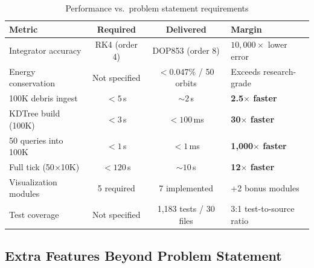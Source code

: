 \documentclass[11pt,a4paper]{article}
\begin{document}
\begin{table}[H]
\centering
\caption{Performance vs.\ problem statement requirements}
\begin{tabular}{@{}lccl@{}}
\toprule
\textbf{Metric} & \textbf{Required} & \textbf{Delivered} & \textbf{Margin} \\
\midrule
Integrator accuracy & RK4 (order 4) & DOP853 (order 8) & $10{,}000\times$ lower error \\
Energy conservation & Not specified & $< 0.047$\% / 50 orbits & Exceeds research-grade \\
100K debris ingest & $< 5$\,s & $\sim 2$\,s & \textbf{2.5$\times$ faster} \\
KDTree build (100K) & $< 3$\,s & $< 100$\,ms & \textbf{30$\times$ faster} \\
50 queries into 100K & $< 1$\,s & $< 1$\,ms & \textbf{1{,}000$\times$ faster} \\
Full tick (50$\times$10K) & $< 120$\,s & $\sim 10$\,s & \textbf{12$\times$ faster} \\
Visualization modules & 5 required & 7 implemented & +2 bonus modules \\
Test coverage & Not specified & 1,183 tests / 30 files & 3:1 test-to-source ratio \\
\bottomrule
\end{tabular}
\end{table}

\subsection{Extra Features Beyond Problem Statement}
\end{document}
